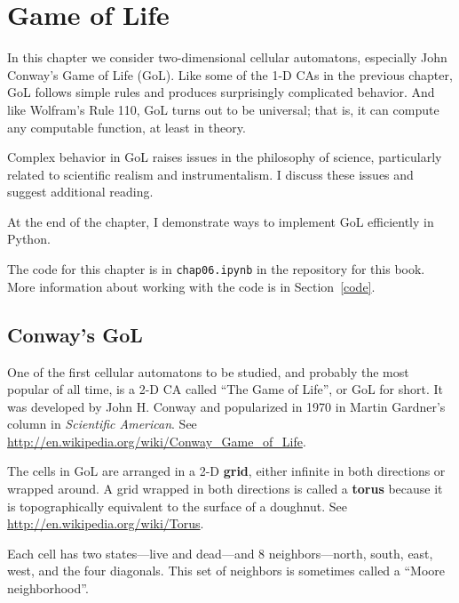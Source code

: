 \documentclass[12pt]{book}
\theoremstyle{exercise}
\begin{document}
\chapter{Game of Life}

In this chapter we consider two-dimensional cellular automatons,
especially John Conway's Game of Life (GoL).  Like some of
the 1-D CAs in the previous chapter, GoL follows simple rules and
produces surprisingly complicated behavior.  And like Wolfram's
Rule 110, GoL turns out to be universal; that is, it can compute
any computable function, at least in theory.

Complex behavior in GoL raises issues in the philosophy of
science, particularly related to scientific realism and instrumentalism.
I discuss these issues and suggest additional reading.

At the end of the chapter, I demonstrate ways to implement
GoL efficiently in Python.

The code for this chapter is in {\tt chap06.ipynb} in the repository
for this book.  More information about working with the code is
in Section~\ref{code}.


\section{Conway's GoL}

\label{life}

One of the first cellular automatons to be studied, and probably the
most popular of all time, is a 2-D CA called ``The Game of Life'', or GoL
for short.  It was developed by John H. Conway and popularized in 1970
in Martin Gardner's column in {\em Scientific American}.
See \url{http://en.wikipedia.org/wiki/Conway_Game_of_Life}.

The cells in GoL are arranged in a 2-D {\bf grid}, either infinite in
both directions or wrapped around.  A grid wrapped in both directions
is called a {\bf torus} because it is topographically equivalent to
the surface of a doughnut.  See
\url{http://en.wikipedia.org/wiki/Torus}.


Each cell has two states---live and dead---and 8 neighbors---north,
south, east, west, and the four diagonals.  This set of neighbors
is sometimes called a ``Moore neighborhood''.

\end{document}
